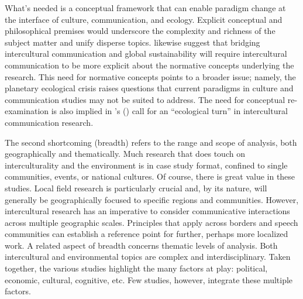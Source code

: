 What's needed is a conceptual framework that can enable paradigm change at the interface of culture, communication, and ecology. Explicit conceptual and philosophical premises would underscore the complexity and richness of the subject matter and unify disperse topics. \cite*{Busch2017a} likewise suggest that bridging intercultural communication and global sustainability will require intercultural communication to be more explicit about the normative concepts underlying the research. This need for normative concepts points to a broader issue; namely, the planetary ecological crisis raises questions that current paradigms in culture and communication studies may not be suited to address. The need for conceptual re-examination is also implied in \citeauthor{Mendoza2016a}'s (\citeyear{Mendoza2016a}) call for an ``ecological turn'' in intercultural communication research. 

The second shortcoming (breadth) refers to the range and scope of analysis, both geographically and thematically. Much research that does touch on interculturality and the environment is in case study format, confined to single communities, events, or national cultures. Of course, there is great value in these studies. Local field research is particularly crucial and, by its nature, will generally be geographically focused to specific regions and communities. However, intercultural research has an imperative to consider communicative interactions across multiple geographic scales. Principles that apply across borders and speech communities can establish a reference point for further, perhaps more localized work. A related aspect of breadth concerns thematic levels of analysis. Both intercultural and environmental topics are complex and interdisciplinary. Taken together, the various studies highlight the many factors at play: political, economic, cultural, cognitive, etc. Few studies, however, integrate these multiple factors. 

